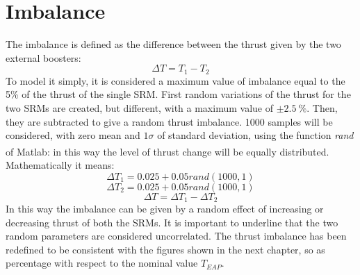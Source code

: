 \documentclass[12pt,fleqn,openany]{book} %
\begin{document}
\section{Imbalance}
The imbalance is defined as the difference between the thrust given by the two external boosters:
\begin{equation}
	\Delta T = T_1-T_2
\end{equation}
To model it simply, it is considered a maximum value of imbalance equal to the 5\% of the thrust of the single SRM. First random variations of the thrust for the two SRMs are created, but different, with a maximum value of $\pm\SI{2.5}{\%}$. Then, they are subtracted to give a random thrust imbalance. 1000 samples will be considered, with zero mean and $1\sigma$ of standard deviation, using the function \textit{rand} of Matlab\textsuperscript\textregistered: in this way the level of thrust change will be equally distributed. Mathematically it means:
\begin{equation}
	\Delta T_1=0.025+0.05rand(1000,1)
\end{equation}
\begin{equation}
	\Delta T_2=0.025+0.05rand(1000,1)
\end{equation}
\begin{equation}
    \Delta T = \Delta T_1-\Delta T_2
\end{equation}
In this way the imbalance can be given by a random effect of increasing or decreasing thrust of both the SRMs. It is important to underline that the two random parameters are considered uncorrelated. The thrust imbalance has been redefined to be consistent with the figures shown in the next chapter, so as percentage with respect to the nominal value $T_{EAP}$. 
\end{document}

